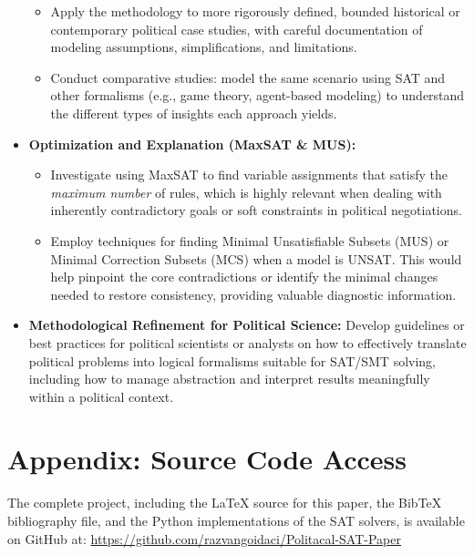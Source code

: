 \documentclass[11pt, a4paper]{article}
\begin{document}
\begin{itemize}
        \begin{itemize}
            \item Apply the methodology to more rigorously defined, bounded historical or contemporary political case studies, with careful documentation of modeling assumptions, simplifications, and limitations.
            \item Conduct comparative studies: model the same scenario using SAT and other formalisms (e.g., game theory, agent-based modeling) to understand the different types of insights each approach yields.
        \end{itemize}
    \item \textbf{Optimization and Explanation (MaxSAT & MUS):}
        \begin{itemize}
            \item Investigate using MaxSAT to find variable assignments that satisfy the \textit{maximum number} of rules, which is highly relevant when dealing with inherently contradictory goals or soft constraints in political negotiations.
            \item Employ techniques for finding Minimal Unsatisfiable Subsets (MUS) or Minimal Correction Subsets (MCS) when a model is UNSAT. This would help pinpoint the core contradictions or identify the minimal changes needed to restore consistency, providing valuable diagnostic information.
        \end{itemize}
    \item \textbf{Methodological Refinement for Political Science:} Develop guidelines or best practices for political scientists or analysts on how to effectively translate political problems into logical formalisms suitable for SAT/SMT solving, including how to manage abstraction and interpret results meaningfully within a political context.
\end{itemize}

\printbibliography

\appendix
\section{Appendix: Source Code Access} \label{app:sourcecode}

The complete project, including the LaTeX source for this paper, the BibTeX bibliography file, and the Python implementations of the SAT solvers, is available on GitHub at:
\url{https://github.com/razvangoidaci/Politacal-SAT-Paper}
\end{document}
